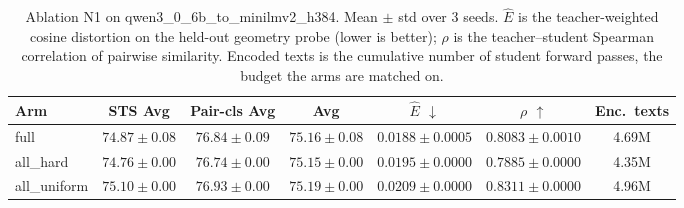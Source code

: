 \begin{table}[t]
\centering
\caption{Ablation N1 on qwen3\_0\_6b\_to\_minilmv2\_h384. Mean $\pm$ std over 3 seeds. $\hat{E}$ is the teacher-weighted cosine distortion on the held-out geometry probe (lower is better); $\rho$ is the teacher--student Spearman correlation of pairwise similarity. Encoded texts is the cumulative number of student forward passes, the budget the arms are matched on.}
\label{tab:ablation_n1_qwen3_0_6b_to_minilmv2_h384}
\begin{tabular}{lcccccc}
\toprule
Arm & STS Avg & Pair-cls Avg & Avg & $\hat{E}$ $\downarrow$ & $\rho$ $\uparrow$ & Enc.\ texts \\
\midrule
full & $74.87 \pm 0.08$ & $76.84 \pm 0.09$ & $75.16 \pm 0.08$ & $0.0188 \pm 0.0005$ & $0.8083 \pm 0.0010$ & 4.69M \\
all\_hard & $74.76 \pm 0.00$ & $76.74 \pm 0.00$ & $75.15 \pm 0.00$ & $0.0195 \pm 0.0000$ & $0.7885 \pm 0.0000$ & 4.35M \\
all\_uniform & $75.10 \pm 0.00$ & $76.93 \pm 0.00$ & $75.19 \pm 0.00$ & $0.0209 \pm 0.0000$ & $0.8311 \pm 0.0000$ & 4.96M \\
\bottomrule
\end{tabular}
\end{table}
